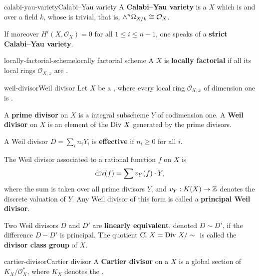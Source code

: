 \begin{topic}{calabi-yau-variety}{Calabi--Yau variety}
    A \textbf{Calabi--Yau variety} is a  $X$ which is  and  over a field $k$, whose  is trivial, that is, $\wedge^n \Omega_{X/k} \cong \mathcal{O}_X$.
    
    If moreover $H^i(X, \mathcal{O}_X) = 0$ for all $1 \le i \le n - 1$, one speaks of a \textbf{strict Calabi--Yau variety}.
\end{topic}

\begin{topic}{locally-factorial-scheme}{locally factorial scheme}
    A  $X$ is \textbf{locally factorial} if all its local rings $\mathcal{O}_{X,x}$ are .
\end{topic}

\begin{topic}{weil-divisor}{Weil divisor}
    Let $X$ be a    , where every local ring $\mathcal{O}_{X,x}$ of dimension one is .
    
    A \textbf{prime divisor} on $X$ is a  integral subscheme $Y$ of codimension one. A \textbf{Weil divisor} on $X$ is an element of the  $\textup{Div } X$ generated by the prime divisors.
    
    A Weil divisor $D = \sum_i n_i Y_i$ is \textbf{effective} if $n_i \ge 0$ for all $i$.
    
    The Weil divisor associated to a rational function $f$ on $X$ is
    \[ \textup{div}(f) = \sum v_Y(f) \cdot Y , \]
    where the sum is taken over all prime divisors $Y$, and $v_Y : K(X) \to \mathbb{Z}$ denotes the discrete valuation of $Y$. Any Weil divisor of this form is called a \textbf{principal Weil divisor}.
    
    Two Weil divisors $D$ and $D'$ are \textbf{linearly equivalent}, denoted $D \sim{} D'$, if the difference $D - D'$ is principal. The quotient $\textup{Cl } X = \textup{Div } X / \sim{}$ is called the \textbf{divisor class group} of $X$.
\end{topic}

\begin{topic}{cartier-divisor}{Cartier divisor}
    A \textbf{Cartier divisor} on a  $X$ is a global section of $K_X / \mathcal{O}_X^*$, where $K_X$ denotes the .
\end{topic}

